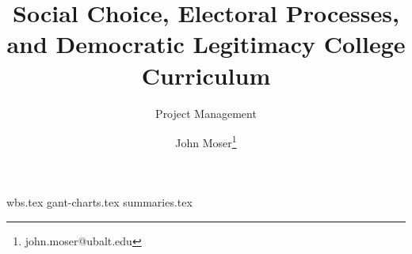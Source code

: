 \documentclass[twoside,titlepage,12pt,appendixprefix=true,usenames,dvipsnames]{scrreprt}
\begin{document}
    \author{John Moser\thanks{john.moser@ubalt.edu}}

    \title{Social Choice, Electoral Processes, and Democratic Legitimacy College Curriculum}
    \subtitle{Project Management}
    \maketitle
    \addtocounter{page}{-1}
    \tableofcontents
    \clearpage
    {wbs.tex}
    {gant-charts.tex}
    {summaries.tex}


\end{document}
